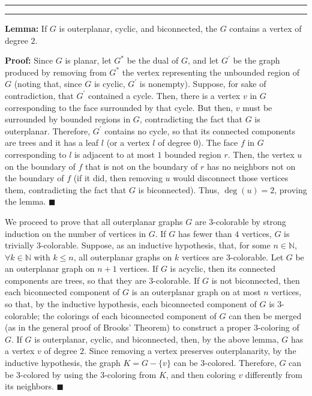 \documentclass[11pt]{article}
\newcounter{questionCounter}
\newcounter{partCounter}[questionCounter]
\newenvironment{question}[2][\arabic{questionCounter}]{%
    \setcounter{partCounter}{0}%
    \vspace{.25in} \hrule \vspace{0.5em}%
        \noindent{\bf #2}%
    \vspace{0.8em} \hrule \vspace{.10in}%
    \addtocounter{questionCounter}{1}%
}{}
\renewcommand{\qed}{\quad $\blacksquare$}
\begin{document}
\begin{question}{Problem 4}
{\bf Lemma:} If $G$ is outerplanar, cyclic, and biconnected, the $G$ contains
a vertex of degree $2$.

{\bf Proof:}
Since $G$ is planar, let $G^*$ be the dual of $G$, and let
$G^{\prime}$ be the graph produced by removing from $G^*$ the vertex
representing the unbounded region of $G$ (noting that, since $G$ is cyclic,
$G^{\prime}$ is nonempty). Suppose, for sake of contradiction, that
$G^{\prime}$ contained a cycle. Then, there is a vertex $v$ in $G$
corresponding to the face surrounded by that cycle. But then, $v$ must be
surrounded by bounded regions in $G$, contradicting the fact that $G$ is
outerplanar. Therefore, $G^{\prime}$ contains no cycle, so that its connected
components are trees and it has a leaf $l$ (or a vertex $l$ of degree $0$).
The face $f$ in $G$ corresponding
to $l$ is adjacent to at most $1$ bounded region $r$. Then, the vertex $u$ on
the boundary of $f$ that is not on the boundary of $r$ has no neighbors not on
the boundary of $f$ (if it did, then removing $u$ would disconnect those
vertices them, contradicting the fact that $G$ is biconnected). Thus,
$\deg(u) = 2$, proving the lemma. \qed

We proceed to prove that all outerplanar graphs $G$ are $3$-colorable by
strong induction on the number of vertices in $G$. If $G$ has fewer than $4$
vertices, $G$ is trivially $3$-colorable. Suppose, as an inductive hypothesis,
that, for some $n \in \mathbb{N}$, $\forall k \in \mathbb{N}$ with $k \leq n$,
all outerplanar graphs on $k$ vertices are $3$-colorable. Let $G$ be an
outerplanar graph on $n + 1$ vertices. If $G$ is acyclic, then its
connected components are trees, so that they are $3$-colorable. If
$G$ is not biconnected, then each biconnected component of $G$ is an
outerplanar graph on at most $n$ vertices, so that, by the inductive
hypothesis, each biconnected component of $G$ is $3$-colorable; the colorings
of each biconnected component of $G$ can then be merged (as in the general
proof of Brooks' Theorem) to construct a proper $3$-coloring of $G$. If $G$ is
outerplanar, cyclic, and biconnected, then, by the above lemma, $G$ has a
vertex $v$ of degree $2$. Since removing a vertex preserves outerplanarity, by
the inductive hypothesis, the graph $K = G - \{v\}$ can be $3$-colored.
Therefore, $G$ can be $3$-colored by using the $3$-coloring from $K$, and then
coloring $v$ differently from its neighbors. \qed
\end{question}
\end{document}
